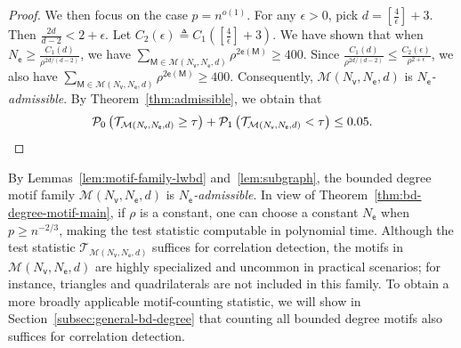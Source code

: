\documentclass[letterpaper,11pt]{article}
\theoremstyle{definition}
\newcommand{\maM}{\mathcal{M}}
\newcommand{\maP}{\mathcal{P}}
\newcommand{\maT}{\mathcal{T}}
\newcommand{\en}{\mathsf{{e}}}
\newcommand{\pth}[1]{\left( #1 \right)}
\newcommand{\qth}[1]{\left[ #1 \right]}
\newcommand{\sfM}{{\mathsf{M}}}
\newcommand{\sfe}{{\mathsf{e}}}
\newcommand{\sfv}{{\mathsf{v}}}
\begin{document}
\begin{proof}
We then focus on the case $p = n^{o(1)}$. For any $\epsilon>0$, pick $d = \qth{\frac{4}{\epsilon}}+3$. Then $\frac{2d}{d-2}<2+\epsilon$. Let $C_2(\epsilon)\triangleq C_1\pth{\qth{\frac{4}{\epsilon}}+3}$. We have shown that when $N_\sfe\ge \frac{C_1(d)}{\rho^{2d/(d-2)}}$, we have $\sum_{\sfM\in \maM(N_\sfv,N_\sfe,d)}\rho^{2\en(\sfM)}\ge 400$.
Since $\frac{C_1(d)}{\rho^{2d/(d-2)}} \le \frac{C_2(\epsilon)}{\rho^{2+\epsilon}}$, we also have $\sum_{\sfM\in \maM(N_\sfv,N_\sfe,d)}\rho^{2\en(\sfM)}\ge 400$.
Consequently, $\maM(N_\sfv,N_\sfe,d)$ is \emph{$N_\sfe$-admissible}. By Theorem~\ref{thm:admissible}, we obtain that \begin{equation*}
\maP_0\pth{\maT_{\maM(N_\sfv,N_\sfe,d)}\ge \tau}+\maP_1\pth{\maT_{\maM(N_\sfv,N_\sfe,d)}< \tau}\le 0.05.\qedhere
\end{equation*}
\end{proof}

By Lemmas~\ref{lem:motif-family-lwbd} and~\ref{lem:subgraph}, the bounded degree motif family $\maM(N_\sfv,N_\sfe,d)$ is \emph{$N_\sfe$-admissible}.
In view of Theorem~\ref{thm:bd-degree-motif-main}, if $\rho$ is a constant, one can choose a constant $N_\sfe$ when $p \ge n^{-2/3}$, making the test statistic computable in polynomial time. Although the test statistic $\maT_{\maM(N_\sfv,N_\sfe,d)}$ suffices for correlation detection, the motifs in $\maM(N_\sfv,N_\sfe,d)$ are highly specialized and uncommon in practical scenarios; for instance, triangles and quadrilaterals are not included in this family. To obtain a more broadly applicable motif-counting statistic, we will show in Section~\ref{subsec:general-bd-degree} that counting all bounded degree motifs also suffices for correlation detection. 
\end{document}
